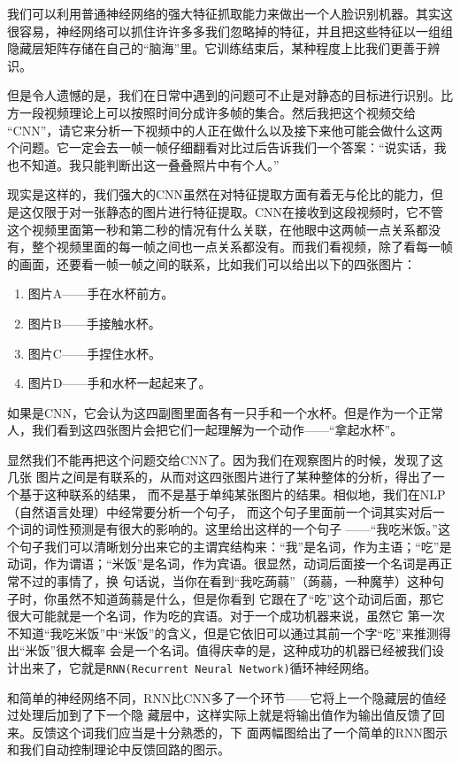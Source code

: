 \documentclass[11pt,a4paper]{elegantpaper}
\begin{document}
\begin{multicols}{2}
我们可以利用普通神经网络的强大特征抓取能力来做出一个人脸识别机器。其实这很容易，神经网络可以抓住许许多多我们忽略掉的特征，并且把这些特征以一组组隐藏层矩阵存储在自己的“脑海”里。它训练结束后，某种程度上比我们更善于辨识。

但是令人遗憾的是，我们在日常中遇到的问题可不止是对静态的目标进行识别。比方一段视频理论上可以按照时间分成许多帧的集合。然后我把这个视频交给 “CNN”，请它来分析一下视频中的人正在做什么以及接下来他可能会做什么这两个问题。它一定会去一帧一帧仔细翻看对比过后告诉我们一个答案：“说实话，我也不知道。我只能判断出这一叠叠照片中有个人。”

现实是这样的，我们强大的CNN虽然在对特征提取方面有着无与伦比的能力，但是这仅限于对一张静态的图片进行特征提取。CNN在接收到这段视频时，它不管这个视频里面第一秒和第二秒的情况有什么关联，在他眼中这两帧一点关系都没有，整个视频里面的每一帧之间也一点关系都没有。而我们看视频，除了看每一帧的画面，还要看一帧一帧之间的联系，比如我们可以给出以下的四张图片：

\begin{enumerate}
  \item 图片A——手在水杯前方。
  \item 图片B——手接触水杯。
  \item 图片C——手捏住水杯。
  \item 图片D——手和水杯一起起来了。
\end{enumerate}

如果是CNN，它会认为这四副图里面各有一只手和一个水杯。但是作为一个正常人，我们看到这四张图片会把它们一起理解为一个动作——“拿起水杯”。

显然我们不能再把这个问题交给CNN了。因为我们在观察图片的时候，发现了这几张
图片之间是有联系的，从而对这四张图片进行了某种整体的分析，得出了一个基于这种联系的结果，
而不是基于单纯某张图片的结果。相似地，我们在NLP（自然语言处理）中经常要分析一个句子，
而这个句子里面前一个词其实对后一个词的词性预测是有很大的影响的。这里给出这样的一个句子
——“我吃米饭。”这个句子我们可以清晰划分出来它的主谓宾结构来：“我”是名词，作为主语；“吃”是
动词，作为谓语；“米饭”是名词，作为宾语。很显然，动词后面接一个名词是再正常不过的事情了，换
句话说，当你在看到“我吃蒟蒻”（蒟蒻，一种魔芋）这种句子时，你虽然不知道蒟蒻是什么，但是你看到
它跟在了“吃”这个动词后面，那它很大可能就是一个名词，作为吃的宾语。对于一个成功机器来说，虽然它
第一次不知道“我吃米饭”中“米饭”的含义，但是它依旧可以通过其前一个字“吃”来推测得出“米饭”很大概率
会是一个名词。值得庆幸的是，这种成功的机器已经被我们设计出来了，它就是\lstinline{RNN(Recurrent Neural Network)}循环神经网络。

和简单的神经网络不同，RNN比CNN多了一个环节——它将上一个隐藏层的值经过处理后加到了下一个隐
藏层中，这样实际上就是将输出值作为输出值反馈了回来。反馈这个词我们应当是十分熟悉的，下
面两幅图给出了一个简单的RNN图示和我们自动控制理论中反馈回路的图示。


\end{multicols}
\end{document}

